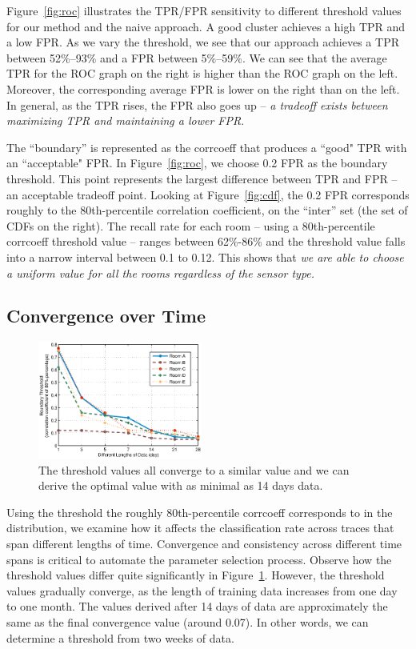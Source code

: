 Figure~\ref{fig:roc} illustrates the TPR/FPR sensitivity to different threshold values for our method and the naive approach. A good cluster achieves a high TPR and a low FPR. 
As we vary the threshold, we see that our approach 
achieves a TPR between 52\%--93\% and a FPR between 5\%--59\%.  %
We can see that the average TPR for the ROC graph on the right is higher than the 
ROC graph on the left.  Moreover, the corresponding average FPR is lower on the right than on the left.
In general, as the TPR rises, the FPR also goes up -- \emph{a tradeoff exists between maximizing TPR and maintaining a lower FPR}.


 The ``boundary'' is represented as the corrcoeff that produces a ``good" TPR with an ``acceptable" FPR.  In Figure~\ref{fig:roc}, 
  we choose 0.2 FPR as the boundary threshold.  This point represents the largest difference between TPR and FPR -- an acceptable tradeoff point. 
Looking at Figure~\ref{fig:cdf}, the 0.2 FPR corresponds roughly to the 80th-percentile correlation coefficient, on the ``inter''
set (the set of CDFs on the right).
  The recall rate for each room -- using a 80th-percentile corrcoeff threshold value -- ranges between 62\%-86\% and the 
  threshold value falls into a narrow interval between 0.1 to 0.12. This shows that \emph{we are able to choose a uniform value 
  for all the rooms regardless of the sensor type.}

\subsection{Convergence over Time}
\begin{figure}[h!]
\centering
	\includegraphics[width=0.48\textwidth]{figs/lengtheffect.eps}
\caption{The threshold values all converge to a similar value and we can derive the optimal value with as minimal as 14 days data.}
\label{fig:leneff}
\end{figure}

Using the threshold the roughly 80th-percentile corrcoeff corresponds to in the distribution, we examine how it affects the classification rate across traces
that span different lengths of time.  Convergence and consistency across different time spans is critical to automate the parameter selection
process.
Observe how the  threshold values differ quite significantly in Figure~\ref{fig:leneff}.  However, 
the threshold values 
gradually converge, as the length of training data increases from one day to one month.  The values derived after 14 days of data
are approximately the same as the final convergence value (around 0.07).  In other words, we can determine a threshold from two weeks of data.


